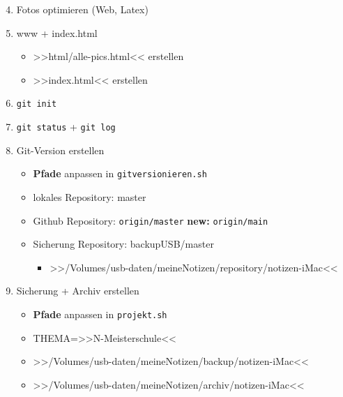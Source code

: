 \begin{enumerate}
\setcounter{enumi}{3}
\item
  Fotos optimieren (Web, Latex)
\item
  www + index.html

  \begin{itemize}
  \item
    >>html/alle-pics.html<< erstellen
  \item
    >>index.html<< erstellen
  \end{itemize}
\item
  \verb|git init|
\item
  \verb|git status| +
  \verb|git log|
\item
  Git-Version erstellen

  \begin{itemize}
  \item
    \textbf{Pfade} anpassen in
    \verb|gitversionieren.sh|
  \item
    lokales Repository: master
  \item
    Github Repository: \verb|origin/master|
    \textbf{new:} \verb|origin/main|
  \item
    Sicherung Repository: backupUSB/master

    \begin{itemize}
    \item
      >>/Volumes/usb-daten/meineNotizen/repository/notizen-iMac<<
    \end{itemize}
  \end{itemize}
\item
  Sicherung + Archiv erstellen

  \begin{itemize}
  \item
    \textbf{Pfade} anpassen in \verb|projekt.sh|
  \item
    THEMA=>>N-Meisterschule<<
  \item
    >>/Volumes/usb-daten/meineNotizen/backup/notizen-iMac<<
  \item
    >>/Volumes/usb-daten/meineNotizen/archiv/notizen-iMac<<
  \end{itemize}
\end{enumerate}
